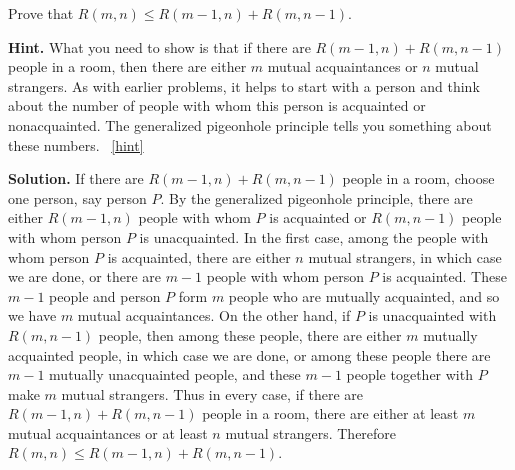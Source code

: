 \documentclass{book}
\begin{document}
\setcounter{project}{52}
\addtocounter{project}{-1}
\begin{activity}[]\label{Ramseyrecurrence}
\hypertarget{p-447}{}%
Prove that \(R(m,n)\le R(m-1,n) + R(m,n-1)\).%
\par\smallskip%
\noindent\textbf{Hint.}\hypertarget{hint-22}{}\quad%
\hypertarget{p-448}{}%
What you need to show is that if there are \(R(m - 1, n) + R(m, n - 1)\) people in a room, then there are either \(m\) mutual acquaintances or \(n\) mutual strangers. As with earlier problems, it helps to start with a person and think about the number of people with whom this person is acquainted or nonacquainted. The generalized pigeonhole principle tells you something about these numbers.%
~\hfill{\tiny\hyperlink{a-52}{[hint]}\hypertarget{q-52}{}}\par\smallskip%
\noindent\textbf{Solution.}\hypertarget{solution-49}{}\quad%
\hypertarget{p-449}{}%
If there are \(R(m-1,n) +R(m,n-1)\) people in a room, choose one person, say person \(P\). By the generalized pigeonhole principle, there are either \(R(m-1,n)\) people with whom \(P\) is acquainted or \(R(m,n-1)\) people with whom person \(P\) is unacquainted. In the first case, among the people with whom person \(P\) is acquainted, there are either \(n\) mutual strangers, in which case we are done, or there are \(m-1\) people with whom person \(P\) is acquainted. These \(m-1\) people and person \(P\) form \(m\) people who are mutually acquainted, and so we have \(m\) mutual acquaintances. On the other hand, if \(P\) is unacquainted with \(R(m,n-1)\) people, then among these people, there are either \(m\) mutually acquainted people, in which case we are done, or among these people there are \(m-1\) mutually unacquainted people, and these \(m-1\) people together with \(P\) make \(m\) mutual strangers. Thus in every case, if there are \(R(m-1,n)+R(m,n-1)\) people in a room, there are either at least \(m\) mutual acquaintances or at least \(n\) mutual strangers. Therefore \(R(m,n)\le R(m-1,n)+R(m,n-1)\).%
\end{activity}
\end{document}

